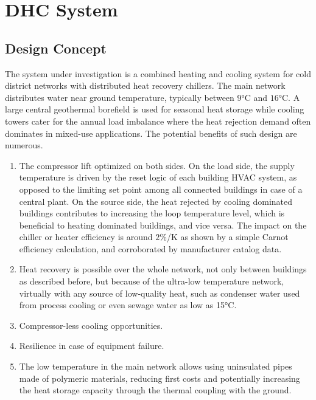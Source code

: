\section{DHC System} \label{sec:dhc}

\subsection{Design Concept} \label{sec:concept}

The system under investigation is a combined heating and cooling system for cold district networks with distributed heat recovery chillers. The main network distributes water near ground temperature, typically between $9$°C and $16$°C. A large central geothermal borefield is used for seasonal heat storage while cooling towers cater for the annual load imbalance where the heat rejection demand often dominates in mixed-use applications.
The potential benefits of such design are numerous.

\begin{enumerate}

    \item The compressor lift optimized on both sides. On the load side, the supply temperature is driven by the reset logic of each building HVAC system, as opposed to the limiting set point among all connected buildings in case of a central plant. On the source side, the heat rejected by cooling dominated buildings contributes to increasing the loop temperature level, which is beneficial to heating dominated buildings, and vice versa. The impact on the chiller or heater efficiency is around $2$\%/K as shown by a simple Carnot efficiency calculation, and corroborated by manufacturer catalog data.

    \item Heat recovery is possible over the whole network, not only between buildings as described before, but because of the ultra-low temperature network, virtually with any source of low-quality heat, such as condenser water used from process cooling or even sewage water as low as 15°C.

    \item Compressor-less cooling opportunities.

    \item Resilience in case of equipment failure.

    \item The low temperature in the main network allows using uninsulated pipes made of polymeric materials, reducing first costs and potentially increasing the heat storage capacity through the thermal coupling with the ground.

\end{enumerate}

